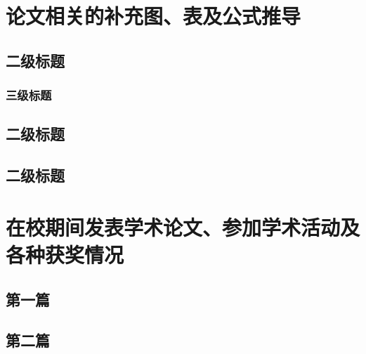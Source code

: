 \documentclass[zihao = -4,linespread = 1.38889, heading = true,no-math]{ctexbook} %
\begin{document}
\gscaepappendix %

\section{论文相关的补充图、表及公式推导}
\subsection{二级标题}
\zhlipsum[1]
\subsubsection{三级标题}
\zhlipsum[1]
\subsection{二级标题}
\zhlipsum[1-2]
\subsection{二级标题}
\zhlipsum[1-2]

\section{在校期间发表学术论文、参加学术活动及各种获奖情况}
\subsection{第一篇}
\zhlipsum[1]

\subsection{第二篇}
\zhlipsum[1]
\end{document}
